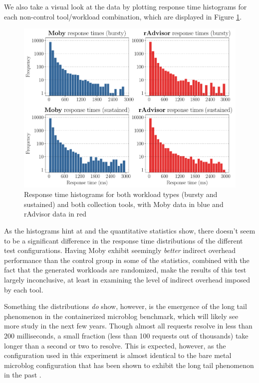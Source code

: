 \documentclass[a4paper,11pt]{article}
\begin{document}
We also take a visual look at the data by plotting response time histograms
for each non-control tool/workload combination, which are displayed in Figure \ref{fig:response_times}.

\pagebreak
\begin{figure}[H]
    \vspace{-0.6em}
    \centering
    \includegraphics[width=\textwidth]{graphs/response_times.pdf}
    \vspace{-0.5em}
    \caption{
        Response time histograms for both workload types (bursty and sustained)
        and both collection tools, with Moby data in \textcolor{moby}{blue}
        and rAdvisor data in \textcolor{radvisor}{red}
    }
    \label{fig:response_times}
    \vspace{0.2em}
\end{figure}

As the histograms hint at and the quantitative statistics show,
there doesn't seem to be a significant difference in the response time distributions
of the different test configurations.
Having Moby exhibit seemingly \textit{better} indirect overhead performance
than the control group in some of the statistics,
combined with the fact that the generated workloads are randomized,
make the results of this test largely inconclusive,
at least in examining the level of indirect overhead imposed by each tool.

Something the distributions \textit{do} show, however,
is the emergence of the long tail phenomenon in the containerized microblog benchmark,
which will likely see more study in the next few years.
Though almost all requests resolve in less than 200 milliseconds,
a small fraction (less than 100 requests out of thousands)
take longer than a second or two to resolve.
This is expected, however, as the configuration used in this experiment
is almost identical to the bare metal microblog configuration that has been shown
to exhibit the long tail phenomenon in the past \cite{microblog}.
\end{document}
